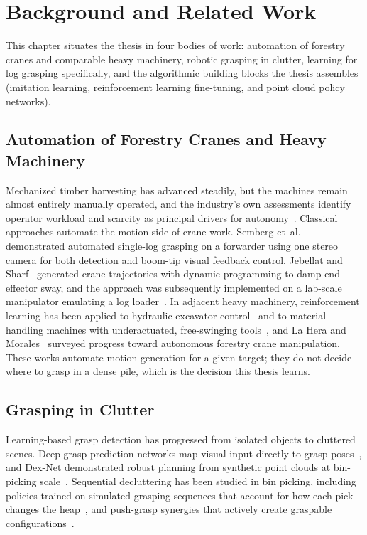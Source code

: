 
\chapter{Background and Related Work}
\label{ch:background}

This chapter situates the thesis in four bodies of work: automation of
forestry cranes and comparable heavy machinery, robotic grasping in clutter,
learning for log grasping specifically, and the algorithmic building blocks
the thesis assembles (imitation learning, reinforcement learning fine-tuning,
and point cloud policy networks).

\section{Automation of Forestry Cranes and Heavy Machinery}

Mechanized timber harvesting has advanced steadily, but the machines remain
almost entirely manually operated, and the industry's own assessments identify
operator workload and scarcity as principal drivers for
autonomy~\cite{lindroos2017forestry, oliveira2021advances}. Classical
approaches automate the motion side of crane work. Semberg
et~al.~\cite{semberg2024} demonstrated automated single-log grasping on a
forwarder using one stereo camera for both detection and boom-tip visual
feedback control. Jebellat and Sharf~\cite{jebellat2023} generated crane
trajectories with dynamic programming to damp end-effector sway, and the
approach was subsequently implemented on a lab-scale manipulator emulating a
log loader~\cite{jebellat2025designing}. In adjacent heavy machinery,
reinforcement learning has been applied to hydraulic excavator
control~\cite{egli2022towards} and to material-handling machines with
underactuated, free-swinging tools~\cite{spinelli2024reinforcement}, and La
Hera and Morales~\cite{la2023autonomous} surveyed progress toward autonomous
forestry crane manipulation. These works automate motion generation for a
given target; they do not decide where to grasp in a dense pile, which is the
decision this thesis learns.

\section{Grasping in Clutter}

Learning-based grasp detection has progressed from isolated objects to
cluttered scenes. Deep grasp prediction networks map visual input directly to
grasp poses~\cite{morrison2018closing, kumra2017robotic}, and Dex-Net
demonstrated robust planning from synthetic point clouds at bin-picking
scale~\cite{mahler2017dexnet}. Sequential decluttering has been studied in bin
picking, including policies trained on simulated grasping sequences that
account for how each pick changes the heap~\cite{mahler2017sequential}, and
push-grasp synergies that actively create graspable
configurations~\cite{zeng2018learning}.

